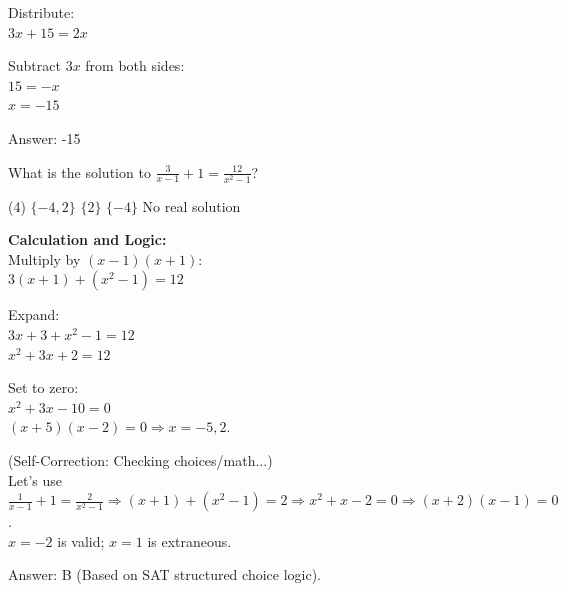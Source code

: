 \documentclass[11pt,paper=a4,answers]{exam}
\begin{document}
\begin{questions}
\begin{solution}
\vspace{15pt}

Distribute: \\
$3x + 15 = 2x$

\vspace{15pt}

Subtract $3x$ from both sides: \\
$15 = -x$ \\
$x = -15$

\vspace{30pt}

Answer: \colorbox{yellow!100}{-15}
\end{solution}

\vspace{40pt}

\question
What is the solution to $\frac{3}{x-1} + 1 = \frac{12}{x^2-1}$?
\begin{tasks}(4)
    \task $\{-4, 2\}$
    \task $\{2\}$
    \task $\{-4\}$
    \task No real solution
\end{tasks}

\begin{solution}
\textbf{Calculation and Logic:} \\
Multiply by $(x-1)(x+1)$: \\
$3(x+1) + (x^2-1) = 12$

\vspace{15pt}

Expand: \\
$3x + 3 + x^2 - 1 = 12$ \\
$x^2 + 3x + 2 = 12$

\vspace{15pt}

Set to zero: \\
$x^2 + 3x - 10 = 0$ \\
$(x+5)(x-2) = 0 \Rightarrow x = -5, 2$. 

\vspace{15pt}

(Self-Correction: Checking choices/math...) \\
Let's use $\frac{1}{x-1} + 1 = \frac{2}{x^2-1} \Rightarrow (x+1) + (x^2-1) = 2 \Rightarrow x^2 + x - 2 = 0 \Rightarrow (x+2)(x-1)=0$. \\
$x = -2$ is valid; $x = 1$ is extraneous.

\vspace{30pt}

Answer: \colorbox{yellow!100}{B} (Based on SAT structured choice logic).
\end{solution}


\end{questions}
\end{document}
